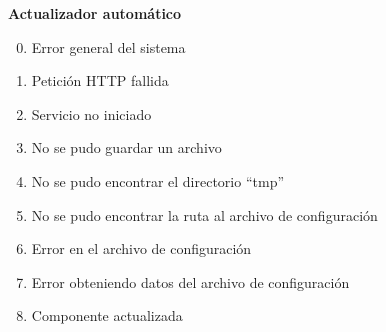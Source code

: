         \textbf{Actualizador automático}
        \begin{enumerate}
            \setcounter{enumi}{-1}
            \item Error general del sistema
            \item Petición HTTP fallida
            \item Servicio no iniciado
            \item No se pudo guardar un archivo
            \item No se pudo encontrar el directorio ``tmp''
            \item No se pudo encontrar la ruta al archivo de configuración
            \item Error en el archivo de configuración
            \item Error obteniendo datos del archivo de configuración
            \item Componente actualizada
        \end{enumerate}{}
        
    

